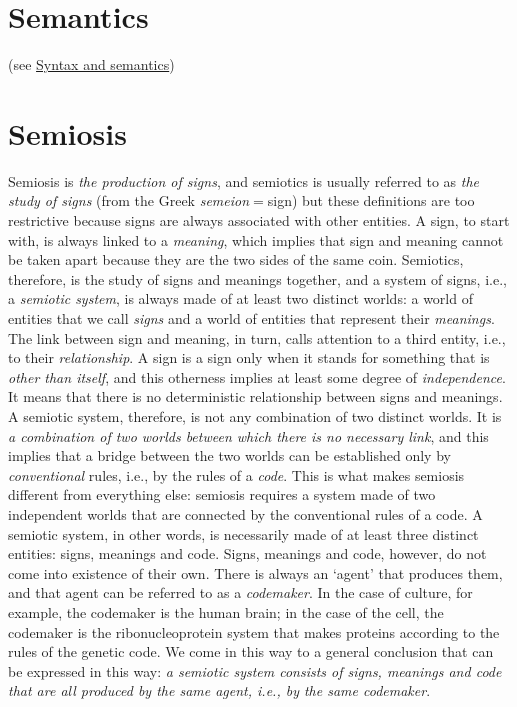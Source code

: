 \documentclass[12pt]{article}
\begin{document}
\section{Semantics}  (see \hyperlink{syntax_and_semantics}{Syntax and semantics})

\section{Semiosis}
Semiosis is \textit{the production of signs}, and semiotics is usually referred to as \textit{the study of signs} (from the Greek \textit{semeion}$=$sign) but these definitions are too restrictive because signs are always associated with other entities. A sign, to start with, is always linked to a \textit{meaning}, which implies that sign and meaning cannot be taken apart because they are the two sides of the same coin. Semiotics, therefore, is the study of signs and meanings together, and a system of signs, i.e., a \textit{semiotic system}, is always made of at least two distinct worlds: a world of entities that we call \textit{signs} and a world of entities that represent their \textit{meanings}. The link between sign and meaning, in turn, calls attention to a third entity, i.e., to their \textit{relationship}. A sign is a sign only when it stands for something that is \textit{other than itself}, and this otherness implies at least some degree of \textit{independence}. It means that there is no deterministic relationship between signs and meanings. A semiotic system, therefore, is not any combination of two distinct worlds. It is \textit{a combination of two worlds between which there is no necessary link}, and this implies that a bridge between the two worlds can be established only by \textit{conventional} rules, i.e., by the rules of a \textit{code}. This is what makes semiosis different from everything else: semiosis requires a system made of two independent worlds that are connected by the conventional rules of a code. A semiotic system, in other words, is necessarily made of at least three distinct entities: signs, meanings and code. Signs, meanings and code, however, do not come into existence of their own. There is always an `agent' that produces them, and that agent can be referred to as a \textit{codemaker}. In the case of culture, for example, the codemaker is the human brain; in the case of the cell, the codemaker is the ribonucleoprotein system that makes proteins according to the rules of the genetic code. We come in this way to a general conclusion that can be expressed in this way: \textit{a semiotic system consists of signs, meanings and code that are all produced by the same agent, i.e., by the same codemaker}.
\end{document}
